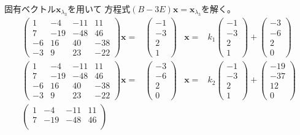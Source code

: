 \documentclass[12pt,b5paper]{ltjsarticle}
\begin{document}
固有ベクトル$\bm{x}_{\lambda_3}$を用いて
方程式$(B-3E)\bm{x}=\bm{x}_{\lambda_3}$を解く。
\begin{align}
 \begin{pmatrix}
  1 & -4 & -11 & 11\\
  7 & -19 & -48 & 46\\
  -6 & 16 & 40 & -38\\
  -3 & 9 & 23 & -22
 \end{pmatrix}
 \bm{x}
 =&
 \begin{pmatrix} -1 \\ -3 \\ 2 \\ 1 \end{pmatrix}
 &
 \bm{x}=&
 k_1\begin{pmatrix} -1 \\ -3 \\ 2 \\ 1 \end{pmatrix}
 +\begin{pmatrix} -3 \\ -6 \\ 2 \\ 0 \end{pmatrix}\\
 \begin{pmatrix}
  1 & -4 & -11 & 11\\
  7 & -19 & -48 & 46\\
  -6 & 16 & 40 & -38\\
  -3 & 9 & 23 & -22
 \end{pmatrix}
 \bm{x}
 =&
 \begin{pmatrix} -3 \\ -6 \\ 2 \\ 0 \end{pmatrix}
 &
 \bm{x}=&
 k_2\begin{pmatrix} -1 \\ -3 \\ 2 \\ 1 \end{pmatrix}
 +\begin{pmatrix} -19 \\ -37 \\ 12 \\ 0 \end{pmatrix}\\
 \begin{pmatrix}
  1 & -4 & -11 & 11\\
  7 & -19 & -48 & 46\\

\end{pmatrix}
\end{align}
\end{document}
